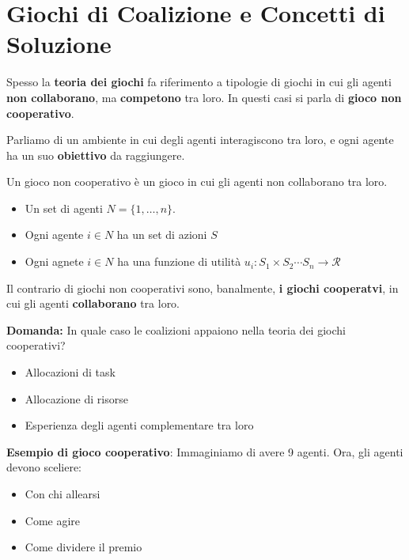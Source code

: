 \section{Giochi di Coalizione e Concetti di Soluzione}
\label{sec:coalition}

Spesso la \textbf{teoria dei giochi} fa riferimento a tipologie di giochi in
cui gli agenti \textbf{non collaborano}, ma \textbf{competono} tra loro. In
questi casi si parla di \textbf{gioco non cooperativo}.

Parliamo di un ambiente in cui degli agenti interagiscono tra loro, e ogni
agente ha un suo \textbf{obiettivo} da raggiungere.

\begin{definition}
    Un gioco non cooperativo è un gioco in cui gli agenti non collaborano tra loro.
    \begin{itemize}
        \item Un set di agenti $N = \{1, \dots, n\}$.
        \item Ogni agente $i \in N$ ha un set di azioni $S$
        \item Ogni agnete $i \in N$ ha una funzione di utilità $u_i: S_1 \times S_2 \cdots
                  S_n \rightarrow \mathcal{R}$
    \end{itemize}
\end{definition}

\begin{definition}
    Il contrario di giochi non cooperativi sono, banalmente, \textbf{i giochi cooperatvi}, in cui gli agenti \textbf{collaborano} tra loro.
\end{definition}

\textbf{Domanda:} In quale caso le coalizioni appaiono nella teoria dei giochi cooperativi?
\begin{itemize}
    \item Allocazioni di task
    \item Allocazione di risorse
    \item Esperienza degli agenti complementare tra loro
\end{itemize}

\textbf{Esempio di gioco cooperativo}: Immaginiamo di avere 9 agenti. Ora, gli agenti devono sceliere:
\begin{itemize}
    \item Con chi allearsi
    \item Come agire
    \item Come dividere il premio
\end{itemize}

